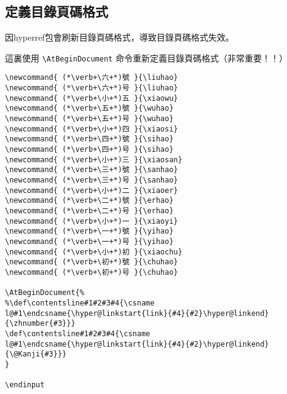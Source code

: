 \subsection{定義目錄頁碼格式}
\par 因hyperref包會刷新目錄頁碼格式，導致目錄頁碼格式失效。
\par 這裏使用 \verb+\AtBeginDocument+ 命令重新定義目錄頁碼格式（非常重要！！）
\begin{lstlisting}[firstnumber=1553]
\newcommand{ (*\verb+\六+*)號 }{\liuhao}
\newcommand{ (*\verb+\六+*)号 }{\liuhao}
\newcommand{ (*\verb+\小+*)五 }{\xiaowu}
\newcommand{ (*\verb+\五+*)號 }{\wuhao}
\newcommand{ (*\verb+\五+*)号 }{\wuhao}
\newcommand{ (*\verb+\小+*)四 }{\xiaosi}
\newcommand{ (*\verb+\四+*)號 }{\sihao}
\newcommand{ (*\verb+\四+*)号 }{\sihao}
\newcommand{ (*\verb+\小+*)三 }{\xiaosan}
\newcommand{ (*\verb+\三+*)號 }{\sanhao}
\newcommand{ (*\verb+\三+*)号 }{\sanhao}
\newcommand{ (*\verb+\小+*)二 }{\xiaoer}
\newcommand{ (*\verb+\二+*)號 }{\erhao}
\newcommand{ (*\verb+\二+*)号 }{\erhao}
\newcommand{ (*\verb+\小+*)一 }{\xiaoyi}
\newcommand{ (*\verb+\一+*)號 }{\yihao}
\newcommand{ (*\verb+\一+*)号 }{\yihao}
\newcommand{ (*\verb+\小+*)初 }{\xiaochu}
\newcommand{ (*\verb+\初+*)號 }{\chuhao}
\newcommand{ (*\verb+\初+*)号 }{\chuhao}

\AtBeginDocument{%
%\def\contentsline#1#2#3#4{\csname l@#1\endcsname{\hyper@linkstart{link}{#4}{#2}\hyper@linkend}{\zhnumber{#3}}}
\def\contentsline#1#2#3#4{\csname l@#1\endcsname{\hyper@linkstart{link}{#4}{#2}\hyper@linkend}{\@Kanji{#3}}}
}

\endinput
\end{lstlisting}


\endinput